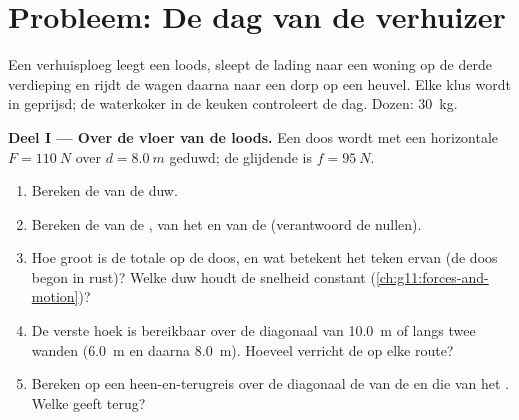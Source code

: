 \section{Probleem: De dag van de verhuizer}

\begin{problem}
\label{pb:g11:work-of-force:1}
Een verhuisploeg leegt een loods, sleept de lading naar een woning op de
derde verdieping en rijdt de wagen daarna naar een dorp op een heuvel.
Elke klus wordt in  geprijsd; de waterkoker in de keuken controleert
de dag. Dozen: \qty{30}{kg}.

\medskip
\noindent\textbf{Deel I --- Over de vloer van de loods.}
Een doos wordt met een horizontale  $F = \qty{110}{N}$ over
$d = \qty{8.0}{m}$ geduwd; de glijdende  is $f = \qty{95}{N}$.
\begin{enumerate}
  \item Bereken de  van de duw.
  \item Bereken de  van de , van het  en van de
         (verantwoord de nullen).
  \item Hoe groot is de totale  op de doos, en wat betekent het
        teken ervan (de doos begon in rust)? Welke duw houdt de snelheid
        constant (\cref{ch:g11:forces-and-motion})?
  \item De verste hoek is bereikbaar over de diagonaal van \qty{10.0}{m}
        of langs twee wanden (\qty{6.0}{m} en daarna \qty{8.0}{m}).
        Hoeveel  verricht de  op elke route?
  \item Bereken op een heen-en-terugreis over de diagonaal de  van
        de  en die van het . Welke  geeft terug?
\end{enumerate}


\end{problem}
